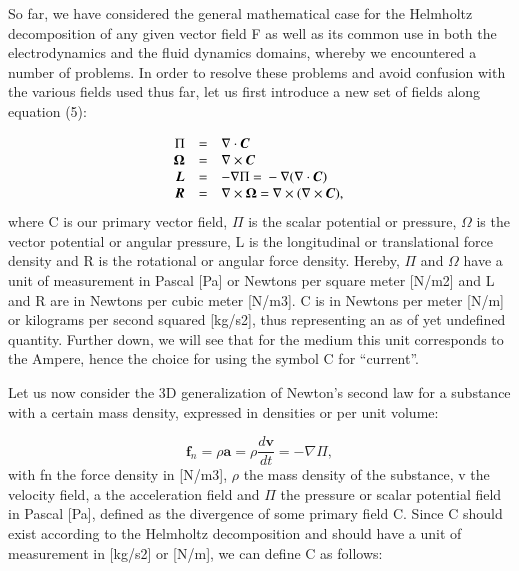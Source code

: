 \documentclass[twoside,final]{article}
\begin{document}
{So far, we have considered the general mathematical case for the Helmholtz
decomposition of any given vector field F as well as its common use in both the
electrodynamics and the fluid dynamics domains, whereby we encountered a number
of problems.  In order to resolve these problems and avoid confusion with the
various fields used thus far, let us first introduce a new set of fields along
equation (5): 

\begin{equation}\label{seq:refText15}
\begin{matrix}\hfill \Pi &=&\nabla \cdot \boldsymbol C\hfill\null \\\hfill \boldsymbol{\Omega }&=&\nabla \times
\boldsymbol C\hfill\null \\\hfill \boldsymbol L&=&-\nabla \Pi \text{ = }-\nabla (\nabla \cdot \boldsymbol
C)\hfill\null \\\hfill \boldsymbol R&=&\nabla \times \boldsymbol{\Omega }\text{ = }\nabla \times (\nabla \times
\boldsymbol C),\hfill\null \end{matrix}
\end{equation}
where C is our primary vector field, $\Pi $ is the scalar potential or pressure,
$\Omega $ is the vector potential or angular pressure, L is the longitudinal or
translational force density and R is the rotational or angular force density.
Hereby, $\Pi $ and $\Omega $ have a unit of measurement in Pascal [Pa] or
Newtons per square meter [N/m2] and L and R are in Newtons per cubic meter
[N/m3]. C is in Newtons per meter [N/m] or kilograms per second squared [kg/s2],
thus representing an as of yet undefined quantity. Further down, we will see
that for the medium this unit corresponds to the Ampere, hence the choice for
using the symbol C for ``current''.

Let us now consider the 3D generalization of Newton's second law for a substance
with a certain mass density, expressed in densities or per unit volume:

\begin{equation}
\boldsymbol f_n=\rho \boldsymbol a=\rho \frac{d\boldsymbol v}{\mathit{dt}}=-{\nabla}\Pi ,
\end{equation}
with fn the force density in [N/m3], $\rho $ the mass density of the substance,
v the velocity field, a the acceleration field and $\Pi $ the pressure or scalar
potential field in Pascal [Pa], defined as the divergence of some primary field
C. Since C should exist according to the Helmholtz decomposition and should have
a unit of measurement in [kg/s2] or [N/m], we can define C as follows:  

}
\end{document}
